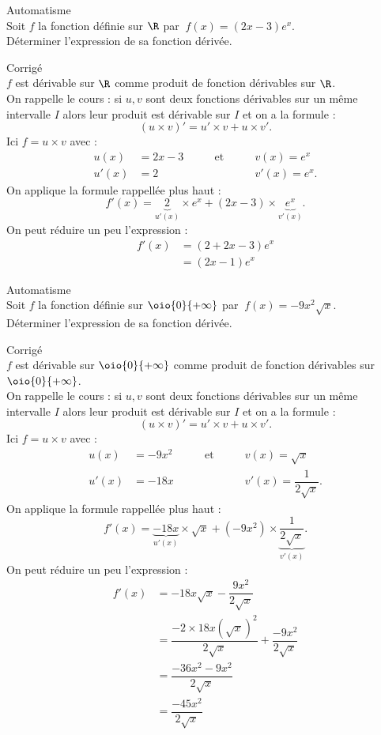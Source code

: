 \documentclass[a4paper,11pt,exos]{nsi} %
\newcounter{autNum}
\newcommand{\aut}[1]
{
	\addtocounter{autNum}{1}
	{\titlefont\color{UGLiBlue}\Large Automatisme\ \theautNum\ \normalsize{#1}}\smallskip	
}
\newcounter{corNum}
\newcommand{\cor}[1]
{
	\addtocounter{corNum}{1}
	{\titlefont\color{UGLiOrange}\Large Corrigé\ \thecorNum\ \normalsize{#1}}\smallskip	
}
\begin{document}
\aut{}\\%
Soit $f$ la fonction définie sur $\R$ par $\ f(x)=(2x-3)e^x$.\\
Déterminer l'expression de sa fonction dérivée.\\

\cor{}\\
$f$ est dérivable sur $\R$ comme produit de fonction dérivables sur $\R$.\\
On rappelle le cours : si $u,v$ sont  deux fonctions dérivables sur un même intervalle $I$ alors leur produit est dérivable sur $I$ et on a la formule : \[(u\times v)'=u'\times v+u\times v'.\]
Ici $f=u\times v$ avec : \[\begin{aligned}u(x)&=2x-3&\qquad \text{et}\qquad & v(x)=e^x\\ u'(x)&=2&&v'(x)=e^x.\end{aligned}\]On applique la  formule rappellée plus haut : \[f'(x)=\underbrace{2}_{u'(x)}\times e^x+(2x-3)\times\underbrace{e^x}_{v'(x)}.\]On peut réduire un peu l'expression : \[\begin{aligned}f'(x)&=(2+2x-3)e^x\\ & =(2x-1)e^x \end{aligned}\]


\aut{}\\%
Soit $f$ la fonction définie sur $\oio{0}{+\infty}$ par $\ f(x)=-9x^2\sqrt{x}$.\\
Déterminer l'expression de sa fonction dérivée.\\

\newpage
\cor{}\\
$f$ est dérivable sur $\oio{0}{+\infty}$ comme produit de fonction dérivables sur $\oio{0}{+\infty}$.\\
On rappelle le cours : si $u,v$ sont  deux fonctions dérivables sur un même intervalle $I$ alors leur produit est dérivable sur $I$ et on a la formule : \[(u\times v)'=u'\times v+u\times v'.\]
Ici $f=u\times v$ avec : \[\begin{aligned}u(x)&=-9x^2&\qquad \text{et}\qquad & v(x)=\sqrt{x}\\ u'(x)&=-18x&&v'(x)=\dfrac{1}{2\sqrt{x}}.\end{aligned}\]On applique la  formule rappellée plus haut : \[f'(x)=\underbrace{-18x}_{u'(x)}\times\sqrt{x}+(-9x^2)\times\underbrace{\dfrac{1}{2\sqrt{x}}}_{v'(x)}.\]On peut réduire un peu l'expression : \[\begin{aligned}f'(x)&=-18x\sqrt{x}-\dfrac{9x^2}{2\sqrt{x}}\\ & =\dfrac{-2\times 18x\left(\sqrt{x}\right)^2}{2\sqrt{x}} +\dfrac{-9x^2}{2\sqrt{x}}\\ & = \dfrac{-36x^2-9x^2}{2\sqrt{x}}\\ & = \dfrac{-45x^2}{2\sqrt{x}}\end{aligned}\]
\end{document}
